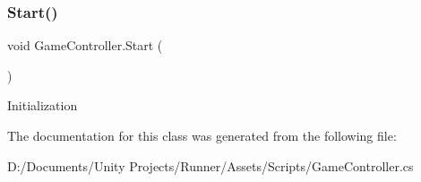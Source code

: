 \subsubsection{\texorpdfstring{Start()}{Start()}}
{\footnotesize\ttfamily void Game\+Controller.\+Start (\begin{DoxyParamCaption}{ }\end{DoxyParamCaption})\hspace{0.3cm}{\ttfamily [private]}}

Initialization 

The documentation for this class was generated from the following file\+:\begin{DoxyCompactItemize}
\item 
D\+:/\+Documents/\+Unity Projects/\+Runner/\+Assets/\+Scripts/Game\+Controller.\+cs\end{DoxyCompactItemize}
